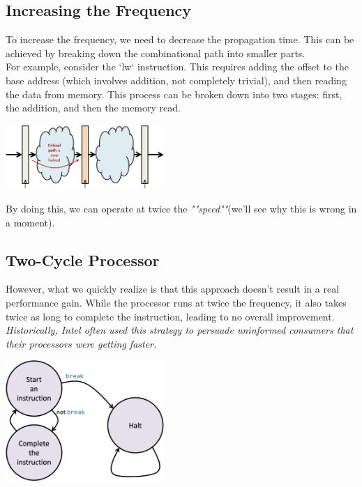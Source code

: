 \subsection{Increasing the Frequency}
To increase the frequency, we need to decrease the propagation time. This can be achieved by breaking down the combinational path into smaller parts. \\
For example, consider the `lw` instruction. This requires adding the offset to the base address (which involves addition, not completely trivial), and then reading the data from memory. This process can be broken down into two stages: first, the addition, and then the memory read. \\
\begin{center}
    \includegraphics[width=0.45\textwidth]{chapters/chapter2a/images/incr_freq.png}
\end{center}
By doing this, we can operate at twice the \textit{""speed""}(we'll see why this is wrong in a moment). \\

\subsection{Two-Cycle Processor}
However, what we quickly realize is that this approach doesn't result in a real performance gain. While the processor runs at twice the frequency, it also takes twice as long to complete the instruction, leading to no overall improvement. \\
\textit{Historically, Intel often used this strategy to persuade uninformed consumers that their processors were getting faster.} \\
\begin{center}
    \includegraphics[width=0.45\textwidth]{chapters/chapter2a/images/two_cyc_processor.png}
\end{center}

